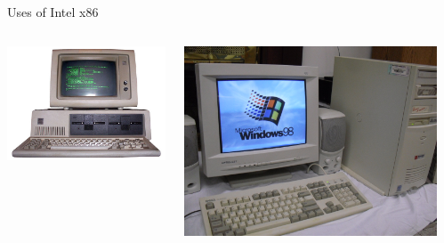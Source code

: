 \begin{frame}{Uses of Intel x86}
	\begin{columns}
		\begin{column}{0.32\textwidth}
			\pause\includegraphics[width=\textwidth]{ibm_5150}
		\end{column}
		\begin{column}{0.32\textwidth}
			\pause\includegraphics[width=\textwidth]{windows_98}
		\end{column}
		\begin{column}{0.32\textwidth}

\end{column}
\end{columns}
\end{frame}
